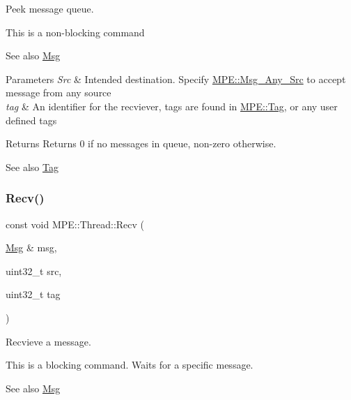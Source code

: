 Peek message queue. 

This is a non-\/blocking command \begin{DoxySeeAlso}{See also}
\hyperlink{struct_m_p_e_1_1_msg}{Msg} 
\end{DoxySeeAlso}

\begin{DoxyParams}{Parameters}
{\em Src} & Intended destination. Specify \hyperlink{namespace_m_p_e_a0a698f47d1ab10c44a414685c36494f1}{M\+P\+E\+::\+Msg\+\_\+\+Any\+\_\+\+Src} to accept message from any source \\
\hline
{\em tag} & An identifier for the recviever, tags are found in \hyperlink{namespace_m_p_e_1_1_tag}{M\+P\+E\+::\+Tag}, or any user defined tags \\
\hline
\end{DoxyParams}
\begin{DoxyReturn}{Returns}
Returns 0 if no messages in queue, non-\/zero otherwise. 
\end{DoxyReturn}
\begin{DoxySeeAlso}{See also}
\hyperlink{namespace_m_p_e_1_1_tag}{Tag} 
\end{DoxySeeAlso}
\mbox{\label{class_m_p_e_1_1_thread_a33de6f9fb89f4ae2adf393e866e198da}} 
\subsubsection{\texorpdfstring{Recv()}{Recv()}}
{\footnotesize\ttfamily const void M\+P\+E\+::\+Thread\+::\+Recv (\begin{DoxyParamCaption}\item[{\hyperlink{struct_m_p_e_1_1_msg}{Msg} \&}]{msg,  }\item[{uint32\+\_\+t}]{src,  }\item[{uint32\+\_\+t}]{tag }\end{DoxyParamCaption})\hspace{0.3cm}{\ttfamily [protected]}}



Recvieve a message. 

This is a blocking command. Waits for a specific message. \begin{DoxySeeAlso}{See also}
\hyperlink{struct_m_p_e_1_1_msg}{Msg} 
\end{DoxySeeAlso}


